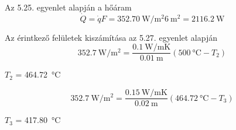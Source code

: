 Az 5.25. egyenlet alapján a hőáram 
\begin{equation}
\dot{Q} = \dot{q} F = \SI{352.70}{\watt\per\meter\squared} \SI{6}{\meter\squared} = \SI{2116.2}{\watt}
\end{equation}

Az érintkező felületek kiszámítása az 5.27. egyenlet alapján
\begin{equation}
\SI{352.7}{\watt\per\meter\squared} = \frac{\SI{0.1}{\watt\per\meter\kelvin}}{\SI{0.01}{\meter}} (\SI{500}{\celsius} - T_2) 
\end{equation}
\begin{center}
	$T_2$ = \SI{464.72}{\celsius}
\end{center}

\begin{equation}
\SI{352.7}{\watt\per\meter\squared} = \frac{\SI{0.15}{\watt\per\meter\kelvin}}{\SI{0.02}{\meter}} (\SI{464,72}{\celsius} - T_3) 
\end{equation}
\begin{center}
	$T_3$ = \SI{417.80}{\celsius}
\end{center}

\pagebreak
 
